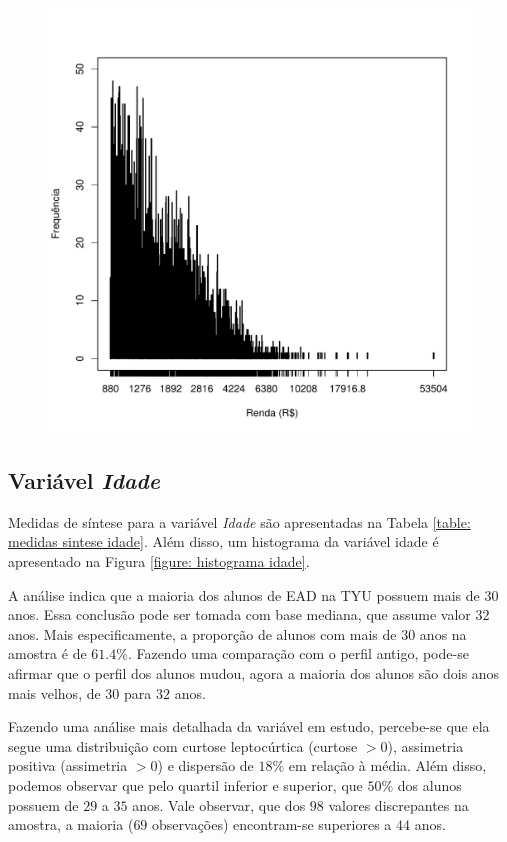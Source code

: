 \documentclass[10pt,a4paper,oneside]{article}
\begin{document}
\begin{figure}[h]
\begin{minipage}{0.46\textwidth}
	\includegraphics[width=\linewidth]{plots/histograma-renda}
	\label{figure: histograma renda}
\end{minipage}
\end{figure}

\clearpage
\subsection*{Variável \textit{Idade}}

Medidas de síntese para a variável \textit{Idade} são apresentadas na Tabela \ref{table: medidas sintese idade}. Além disso, um histograma da variável idade é apresentado na Figura \ref{figure: histograma idade}.

A análise indica que a maioria dos alunos de EAD na TYU possuem mais de $30$ anos. Essa conclusão pode ser tomada com base mediana, que assume valor $32$ anos. Mais especificamente, a proporção de alunos com mais de 30 anos na amostra é de $61.4\%$. Fazendo uma comparação com o perfil antigo, pode-se afirmar que o perfil dos alunos mudou, agora a maioria dos alunos são dois anos mais velhos, de $30$ para $32$ anos.

Fazendo uma análise mais detalhada da variável em estudo, percebe-se que ela segue uma distribuição com curtose leptocúrtica (curtose $> 0$), assimetria positiva (assimetria $> 0$) e dispersão de $18\%$ em relação à média. Além disso, podemos observar que pelo quartil inferior e superior, que $50\%$  dos alunos possuem de $29$ a $35$ anos. Vale observar, que dos $98$ valores discrepantes na amostra, a maioria ($69$ observações) encontram-se superiores a $44$ anos.
\end{document}
